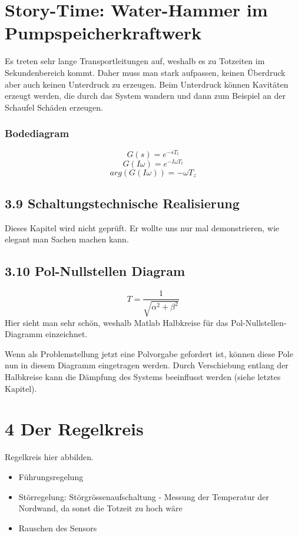 \documentclass[a4paper]{article}
\begin{document}
\section*{Story-Time: Water-Hammer im Pumpspeicherkraftwerk}
Es treten sehr lange Transportleitungen auf, weshalb es zu Totzeiten im Sekundenbereich kommt. Daher muss man stark aufpassen, keinen Überdruck aber auch keinen Unterdruck zu erzeugen. Beim Unterdruck können Kavitäten erzeugt werden, die durch das System wandern und dann zum Beispiel an der Schaufel Schäden erzeugen.

\subsubsection*{Bodediagram}
\[ G(s)=e^{-sT_{t}} \]
\[ G(I\omega)=e^{-I\omega T_{t}} \]
\[ arg(G(I\omega))=-\omega T_{z}\]

\subsection*{3.9 Schaltungstechnische Realisierung}
Dieses Kapitel wird nicht geprüft.
Er wollte uns nur mal demonstrieren, wie elegant man Sachen machen kann.

\subsection*{3.10 Pol-Nullstellen Diagram}
\[ T=\frac{1}{\sqrt{\alpha^{2}+\beta^{2}} } \]
Hier sieht man sehr schön, weshalb Matlab Halbkreise für das Pol-Nullstellen-Diagramm einzeichnet.

Wenn als Problemstellung jetzt eine Polvorgabe gefordert ist, können diese Pole nun in diesem Diagramm eingetragen werden.
Durch Verschiebung entlang der Halbkreise kann die Dämpfung des Systems beeinflusst werden (siehe letztes Kapitel).

\section*{4 Der Regelkreis}
Regelkreis hier abbilden.
\begin{itemize}
    \item Führungsregelung
    \item Störregelung: Störgrössenaufschaltung -  Messung der Temperatur der Nordwand, da sonst die Totzeit zu hoch wäre
    \item Rauschen des Sensors
\end{itemize}
\end{document}
